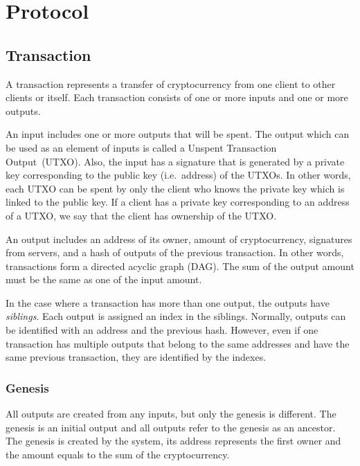 \documentclass[a4paper, oneside]{discothesis}
\begin{document}
\section{Protocol}

\subsection{Transaction}
A transaction represents a transfer of cryptocurrency from one client to other clients or itself.
Each transaction consists of one or more inputs and one or more outputs.

An input includes one or more outputs that will be spent.
The output which can be used as an element of inputs is called
a Unspent Transaction Output~(UTXO).
Also, the input has a signature that is generated by a private key
corresponding to the public key (i.e.\ address) of the UTXOs.
In other words, each UTXO can be spent by only the client who knows the private
key which is linked to the public key.
If a client has a private key corresponding to an address of a UTXO,
we say that the client has ownership of the UTXO.

An output includes an address of its owner, amount of cryptocurrency, signatures from servers,
and a hash of outputs of the previous transaction.
In other words, transactions form a directed acyclic graph (DAG).
The sum of the output amount must be the same as one of the input amount.

In the case where a transaction has more than one output, the outputs have \emph{siblings}.
Each output is assigned an index in the siblings.
Normally, outputs can be identified with an address and the previous hash.
However, even if one transaction has multiple outputs that belong to the same addresses
and have the same previous transaction, they are identified by the indexes.

\subsubsection{Genesis}
All outputs are created from any inputs, but only the genesis is different.
The genesis is an initial output and all outputs refer to the genesis as an ancestor.
The genesis is created by the system, its address represents the first owner
and the amount equals to the sum of the cryptocurrency.
\end{document}

